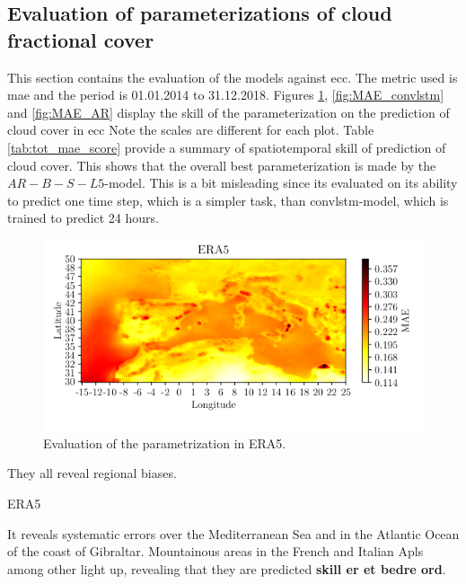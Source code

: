 \subsection{Evaluation of parameterizations of cloud fractional cover}
This section contains the evaluation of the models against \acrshort{ecc}. The metric used is \acrshort{mae} and the period is 01.01.2014 to 31.12.2018. Figures \ref{fig:MAE_era}, \ref{fig:MAE_convlstm} and \ref{fig:MAE_AR} display the skill of the parameterization on the prediction of cloud cover in \acrshort{ecc}
Note the scales are different for each plot. Table \ref{tab:tot_mae_score} provide a summary of spatiotemporal skill of prediction of cloud cover. This shows that the overall best parameterization is made by the $AR-B-S-L5$-model. This is a bit misleading since its evaluated on its ability to predict one time step, which is a simpler task, than \acrshort{convlstm}-model, which is trained to predict 24 hours. 


\begin{figure}
    \centering
    \includegraphics{python_figs/mae_era_vs_target_test_period_2014_to_2018.png}
    \caption{Evaluation of the parametrization in ERA5.}
    \label{fig:MAE_era}
\end{figure}

They all reveal regional biases. 

ERA5 


It reveals systematic errors over the Mediterranean Sea and in the Atlantic Ocean of the coast of Gibraltar. Mountainous areas in the French and Italian Apls among other light up, revealing that they are predicted \textbf{skill er et bedre ord}. 

